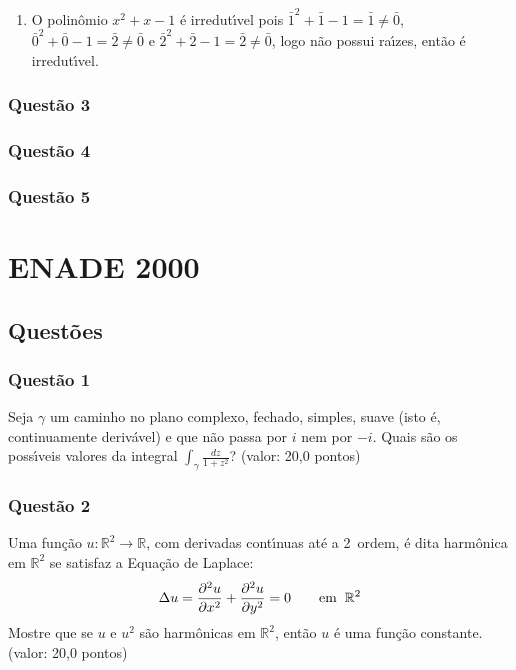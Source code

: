 \documentclass{report}
\begin{document}
\begin{enumerate}

\item[(a)] O polinômio $x^2+x-1$ \'e irredut\'\i vel pois $\bar 1^2+\bar 1 -1=\bar 1 \neq \bar 0$, $\bar 0^2+\bar 0-1=\bar 2\neq \bar 0$ e $\bar 2^2+\bar 2-1=\bar 2 \neq \bar 0$, logo n\~ao possui ra\'\i zes, ent\~ao \'e irredut\'\i vel.

\end{enumerate}

\subsection{\color{red} Quest\~ao 3}

\subsection{\color{red} Quest\~ao 4}

\subsection{\color{red} Quest\~ao 5}

\chapter{ENADE 2000}

\section{\color{blue} Quest\~oes}

\subsection{\color{blue} Quest\~ao 1}

Seja $\gamma$ um caminho no plano complexo, fechado, simples, suave (isto \'e, continuamente deriv\'avel) e que n\~ao passa por $i$ nem por $-i$. Quais s\~ao os poss\'\i veis valores da integral $\displaystyle \int_\gamma \frac{dz}{1+z^2}$? (valor: 20,0 pontos)

\subsection{\color{blue} Quest\~ao 2}

Uma fun\c c\~ao $u: \mathbb R^2 \to \mathbb R$, com derivadas cont\'\i nuas at\'e a 2\textordfeminine\ ordem, \'e dita harmônica em $\mathbb R^2$ se satisfaz a Equa\c c\~ao de Laplace: $$\Delta u={\partial^2u\over\partial x^2}+{\partial^2u\over\partial y^2}=0 \qquad \rm{em}\;\; \mathbb R^2$$ Mostre que se $u$ e $u^2$ s\~ao harmônicas em $\mathbb R^2$, ent\~ao $u$ \'e uma fun\c c\~ao constante. (valor: 20,0 pontos)
\end{document}

